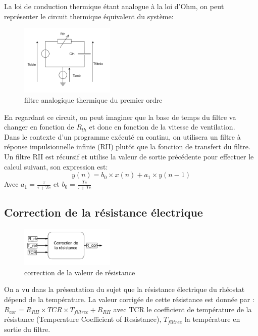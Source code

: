 \documentclass[a4paper]{report}
\begin{document}
	La loi de conduction thermique étant analogue à la loi d'Ohm, on peut représenter le circuit thermique équivalent du système:
	\begin{figure}[h]				
		\centering
		\includegraphics[width=0.4\textwidth]{schema_rcth}
		\caption{filtre analogique thermique du premier ordre}
		\label{schema:rcth}			
	\end{figure}
	
	En regardant ce circuit, on peut imaginer que la base de temps du filtre va changer en fonction de $R_{th}$ et donc en fonction de la vitesse de ventilation.\\
	
	Dans le contexte d'un programme exécuté en continu, on utilisera un filtre à réponse impulsionnelle infinie (RII) plutôt que la fonction de transfert du filtre. Un filtre RII est récursif et utilise la valeur de sortie précédente pour effectuer le calcul suivant, son expression est:
	$$ y(n) = b_0 \times x(n) + a_1 \times  y(n-1) $$ 
	Avec  $ a_1 = \frac{\tau}{\tau + Te} $ et $ b_0 = \frac{Te}{\tau + Te} $
	
	\pagebreak %
	
	\subsection{Correction de la résistance électrique}
	
	\begin{figure}
		\includegraphics[width=0.4\textwidth]{R_cor}
		\caption{correction de la valeur de résistance}
		\label{schema:r_cor}
	\end{figure}
	On a vu dans la présentation du sujet que la résistance électrique du rhéostat dépend de la température. La valeur corrigée de cette résistance est donnée par : $ R_{cor} = R_{RH} \times TCR \times T_{filtree} + R_{RH}  $ avec TCR le coefficient de température de la résistance (Temperature Coefficient of Resistance), $T_{filtree}$ la température en sortie du filtre.\\
	
\end{document}
